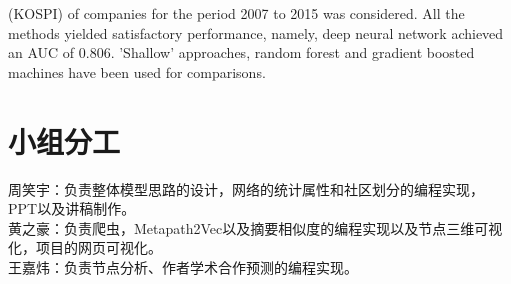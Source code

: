 \documentclass{bmvc2k}
\begin{document}
(KOSPI) of companies for the period 2007 to 2015 was considered. All the methods yielded satisfactory performance, namely, deep neural network achieved an AUC of 0.806. 'Shallow' approaches, random forest and gradient boosted machines have been used for comparisons. \\
%				



\section{小组分工}
\noindent 周笑宇：负责整体模型思路的设计，网络的统计属性和社区划分的编程实现，PPT以及讲稿制作。\\
\noindent 黄之豪：负责爬虫，Metapath2Vec以及摘要相似度的编程实现以及节点三维可视化，项目的网页可视化。\\
\noindent 王嘉炜：负责节点分析、作者学术合作预测的编程实现。




















\end{document}
